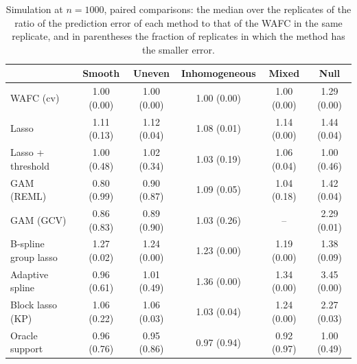 \begin{table}[tp]
\caption{Simulation at $n = 1000$, paired comparisons: the median over the replicates of the ratio of the prediction error of each method to that of the WAFC in the same replicate, and in parentheses the fraction of replicates in which the method has the smaller error.}
\label{tab:sim-paired}
\centering
\small
\setlength{\tabcolsep}{6pt}
\begin{tabular}{lccccc}
\hline
 & Smooth & Uneven & Inhomogeneous & Mixed & Null \\
\hline
WAFC (cv) & 1.00 (0.00) & 1.00 (0.00) & 1.00 (0.00) & 1.00 (0.00) & 1.29 (0.00) \\
Lasso & 1.11 (0.13) & 1.12 (0.04) & 1.08 (0.01) & 1.14 (0.00) & 1.44 (0.04) \\
Lasso + threshold & 1.00 (0.48) & 1.02 (0.34) & 1.03 (0.19) & 1.06 (0.04) & 1.00 (0.46) \\
GAM (REML) & 0.80 (0.99) & 0.90 (0.87) & 1.09 (0.05) & 1.04 (0.18) & 1.42 (0.04) \\
GAM (GCV) & 0.86 (0.83) & 0.89 (0.90) & 1.03 (0.26) & -- & 2.29 (0.01) \\
B-spline group lasso & 1.27 (0.02) & 1.24 (0.00) & 1.23 (0.00) & 1.19 (0.00) & 1.38 (0.09) \\
Adaptive spline & 0.96 (0.61) & 1.01 (0.49) & 1.36 (0.00) & 1.34 (0.00) & 3.45 (0.00) \\
Block lasso (KP) & 1.06 (0.22) & 1.06 (0.03) & 1.03 (0.04) & 1.24 (0.00) & 2.27 (0.03) \\
Oracle support & 0.96 (0.76) & 0.95 (0.86) & 0.97 (0.94) & 0.92 (0.97) & 1.00 (0.49) \\
\hline
\end{tabular}
\end{table}

